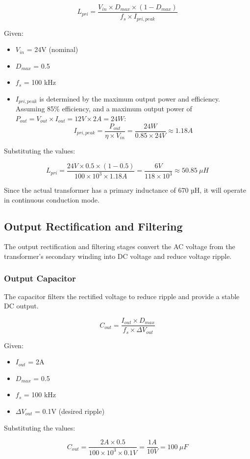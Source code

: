 \documentclass{article}
\begin{document}
\[
L_{pri} = \frac{V_{in} \times D_{max} \times (1 - D_{max})}{f_s \times I_{pri, peak}}
\]

Given:
\begin{itemize}
    \item $V_{in}$ = 24V (nominal)
    \item $D_{max}$ = 0.5
    \item $f_s$ = 100 kHz
    \item $I_{pri, peak}$ is determined by the maximum output power and efficiency. Assuming 85\% efficiency, and a maximum output power of $P_{out} = V_{out} \times I_{out} = 12V \times 2A = 24W$:
    \[
    I_{pri, peak} = \frac{P_{out}}{\eta \times V_{in}} = \frac{24W}{0.85 \times 24V} \approx 1.18A
    \]
\end{itemize}

Substituting the values:

\[
L_{pri} = \frac{24V \times 0.5 \times (1 - 0.5)}{100 \times 10^3 \times 1.18A} = \frac{6V}{118 \times 10^3} \approx 50.85\ \mu H
\]

Since the actual transformer has a primary inductance of 670 µH, it will operate in continuous conduction mode.

\subsection{Output Rectification and Filtering}
The output rectification and filtering stages convert the AC voltage from the transformer's secondary winding into DC voltage and reduce voltage ripple.

\subsubsection{Output Capacitor}
The capacitor filters the rectified voltage to reduce ripple and provide a stable DC output.

\[
C_{out} = \frac{I_{out} \times D_{max}}{f_s \times \Delta V_{out}}
\]

Given:
\begin{itemize}
    \item $I_{out}$ = 2A
    \item $D_{max}$ = 0.5
    \item $f_s$ = 100 kHz
    \item $\Delta V_{out}$ = 0.1V (desired ripple)
\end{itemize}

Substituting the values:

\[
C_{out} = \frac{2A \times 0.5}{100 \times 10^3 \times 0.1V} = \frac{1A}{10V} = 100\ \mu F
\]
\end{document}
